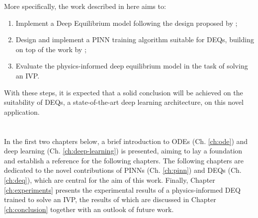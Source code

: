 More specifically, the work described in here aims to:
\begin{enumerate}
    \item Implement a Deep Equilibrium model following the design proposed by \textcite{Bai2019};
    \item Design and implement a \gls{PINN} training algorithm suitable for \gls{DEQ}s, building on top of the work by \textcite{Raissi2019};
    \item Evaluate the physics-informed deep equilibrium model in the task of solving an \gls{IVP}.
\end{enumerate}
With these steps, it is expected that a solid conclusion will be achieved on the suitability of \gls{DEQ}s, a state-of-the-art deep learning architecture, on this novel application.





\section*{}

In the first two chapters below, a brief introduction to \gls{ODE}s (Ch. \ref{ch:ode}) and deep learning (Ch. \ref{ch:deep-learning}) is presented, aiming to lay a foundation and establish a reference for the following chapters.
The following chapters are dedicated to the novel contributions of \gls{PINN}s (Ch. \ref{ch:pinn}) and \gls{DEQ}s (Ch. \ref{ch:deq}), which are central for the aim of this work.
Finally, Chapter \ref{ch:experiments} presents the experimental results of a physics-informed \gls{DEQ} trained to solve an \gls{IVP}, the results of which are discussed in Chapter \ref{ch:conclusion} together with an outlook of future work.
